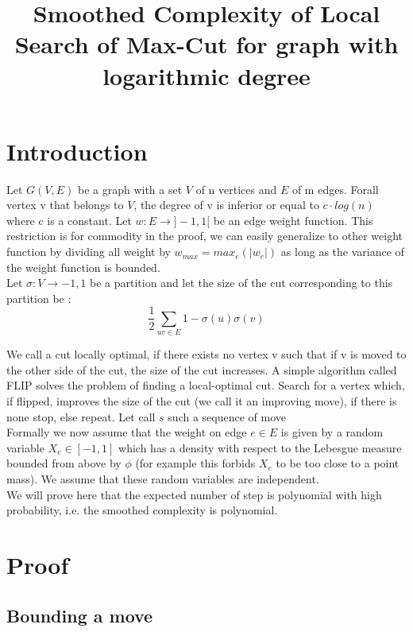 \documentclass[12pt]{article}
\title{Smoothed Complexity of Local Search of Max-Cut for graph with logarithmic degree}
\begin{document}
\maketitle

\section{Introduction}

Let $G(V,E)$ be a graph with a set $V$ of n vertices and $E$ of m edges. Forall vertex v that belongs to $V$, the degree of v is inferior or equal to $c \cdot log(n)$ where c is a constant. Let $ w : E \rightarrow ]-1, 1[$ be an edge weight function. This restriction is for commodity in the proof, we can easily generalize to other weight function by dividing all weight by $w_{max} = max_e (|w_e|)$ as long as the variance of the weight function is bounded. \\
Let $\sigma : V \rightarrow {-1,1}$ be a partition and let the size of the cut corresponding to this partition be :
\begin{equation*}
\dfrac{1}{2}\sum_{uv \in E} {1 - \sigma(u)\sigma(v) }
\end{equation*}

We call a cut locally optimal, if there exists no vertex v such that if v is moved to the other side of the cut, the size of the cut increases. 
A simple algorithm called FLIP solves the problem of finding a local-optimal cut. Search for a vertex which, if flipped, improves the size of the cut (we call it an improving move), if there is none stop, else repeat. Let call $s$ such a sequence of move \\

Formally we now assume that the weight on edge $e \in E$ is given by a random variable $X_e \in [-1,1]$ which has a density with respect to the Lebesgue measure bounded from above by $\phi$ (for example this forbids $X_e$ to be too close to a point mass). We assume that these random variables are independent.\\
We will prove here that the expected number of step is polynomial with high probability, i.e. the smoothed complexity is polynomial. 


\section{Proof}
\subsection{Bounding a move}
\end{document}
